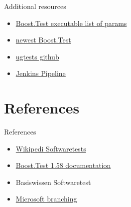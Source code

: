 \documentclass{beamer}
\begin{document}
    \begin{frame}{Additional resources}
            \begin{itemize}
                \item \href{https://www.boost.org/doc/libs/1_58_0/libs/test/doc/html/utf/user-guide/runtime-config/reference.html}{Boost.Test executable list of params}
                \item \href{https://www.boost.org/doc/libs/1_73_0/libs/test/}{newest Boost.Test} %
                \item \href{https://github.com/UG4/plugin_UGTest}{ugtests github}
                \item \href{https://www.jenkins.io/doc/book/pipeline/syntax/}{Jenkins Pipeline}
            \end{itemize}
    \end{frame}

    \section{References}
    \begin{frame}{References}
        \begin{itemize}
            \item \href{https://en.wikipedia.org/wiki/Software_testing}{Wikipedi Softwaretests}
            \item \href{https://www.boost.org/doc/libs/1_58_0/libs/test/}{Boost.Test 1.58 documentation}
            \item Basiswissen Softwaretest
            \item \href{https://docs.microsoft.com/en-us/azure/devops/repos/git/git-branching-guidance?view=azure-devops}{Microsoft branching}
        \end{itemize}
    \end{frame}
\end{document}
